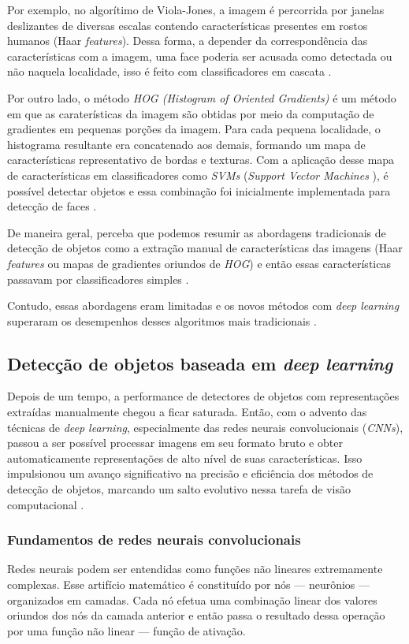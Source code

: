 Por exemplo, no algorítimo de Viola-Jones, a imagem é percorrida por janelas deslizantes de diversas escalas contendo características presentes em rostos humanos (Haar \emph{features}). Dessa forma, a depender da correspondência das características com a imagem, uma face poderia ser acusada como detectada ou não naquela localidade, isso é feito com classificadores em cascata \citep{Viola}.

Por outro lado, o método \emph{HOG (Histogram of Oriented Gradients)} é um método em que as caraterísticas da imagem são obtidas por meio da computação de gradientes em pequenas porções da imagem. Para cada pequena localidade, o histograma resultante era concatenado aos demais, formando um mapa de características representativo de bordas e texturas. Com a aplicação desse mapa de características em classificadores como \emph{SVMs} (\emph{Support Vector Machines} \citep{Cortes1995Support-Vector}), é possível detectar objetos e essa combinação foi inicialmente implementada para detecção de faces \citep{HOG}.

De maneira geral, perceba que podemos resumir as abordagens tradicionais de detecção de objetos como a extração manual de características das imagens (Haar \emph{features} ou mapas de gradientes oriundos de \emph{HOG}) e então essas características passavam por classificadores simples \citep{Viola, HOG}.

Contudo, essas abordagens eram limitadas e os novos métodos com \emph{deep learning} superaram os desempenhos desses algoritmos mais tradicionais \citep{Zou2019Object}.

\subsection{Detecção de objetos baseada em \emph{deep learning}}
Depois de um tempo, a performance de detectores de objetos com representações extraídas manualmente chegou a ficar saturada. Então, com o advento das técnicas de \emph{deep learning}, especialmente das redes neurais convolucionais (\emph{CNNs}), passou a ser possível processar imagens em seu formato bruto e obter automaticamente representações de alto nível de suas características. Isso impulsionou um avanço significativo na precisão e eficiência dos métodos de detecção de objetos, marcando um salto evolutivo nessa tarefa de visão computacional \citep{Zou2019Object}.

\subsubsection{Fundamentos de redes neurais convolucionais}
Redes neurais podem ser entendidas como funções não lineares extremamente complexas. Esse artifício matemático é constituído por nós --- neurônios --- organizados em camadas. Cada nó efetua uma combinação linear dos valores oriundos dos nós da camada anterior e então passa o resultado dessa operação por uma função não linear --- função de ativação. 

